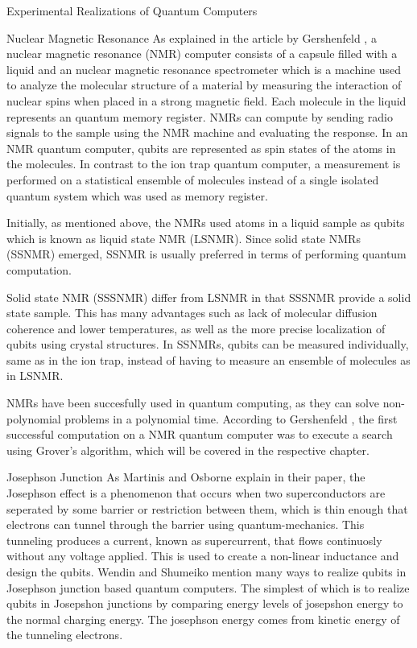 \documentclass[aps,preprintnumbers,twocolumn]{revtex4}
\begin{document}
\begin{section}{Experimental Realizations of Quantum Computers}
\begin{subsection}{Nuclear Magnetic Resonance}
As explained in the article by Gershenfeld \cite{Gershenfeld1998QuantumCW}, a nuclear magnetic resonance (NMR) computer consists of a capsule filled with a liquid and an nuclear magnetic resonance spectrometer which is a machine used to analyze the molecular structure of a material by measuring the interaction of nuclear spins when placed in a strong magnetic field.
Each molecule in the liquid represents an quantum memory register. 
NMRs can compute by sending radio signals to the sample using the NMR machine and evaluating the response. 
In an NMR quantum computer, qubits are represented as spin states of the atoms in the molecules. 
In contrast to the ion trap quantum computer, 
a measurement is performed on a statistical ensemble of molecules instead of a single isolated quantum system which was used as memory register. 

Initially, as mentioned above, the NMRs used atoms in a liquid sample as qubits which is known as liquid state NMR (LSNMR). 
Since solid state NMRs (SSNMR) emerged, SSNMR is usually preferred in terms of performing quantum computation.

Solid state NMR (SSSNMR) differ from LSNMR in that SSSNMR provide a solid state sample.
This has many advantages such as lack of molecular diffusion coherence and lower temperatures, as well as the more precise localization of qubits using crystal structures.
In SSNMRs, qubits can be measured individually, same as in the ion trap,
instead of having to measure an ensemble of molecules as in LSNMR. 

NMRs have been succesfully used in quantum computing, as they can solve non-polynomial problems in a polynomial time.
According to Gershenfeld \cite{Gershenfeld1998QuantumCW}, the first successful computation on a NMR quantum computer was to execute a search using Grover's algorithm, 
which will be covered in the respective chapter. 
\end{subsection}

\begin{subsection}{Josephson Junction}
As Martinis and Osborne explain in their paper, 
the Josephson effect is a phenomenon that occurs when two superconductors are seperated 
by some barrier or restriction between them, which is thin enough that electrons can tunnel through the barrier using quantum-mechanics. 
This tunneling produces a current, known as supercurrent, that flows continuosly without any voltage applied. 
This is used to create a non-linear inductance and design the qubits. 
Wendin and Shumeiko mention \cite{shumeiko} many ways to realize qubits in Josephson junction based quantum computers. 
The simplest of which is to realize qubits in Josepshon junctions by comparing energy levels of josepshon energy to the normal charging energy. 
The josephson energy comes from kinetic energy of the tunneling electrons.


\end{subsection}
\end{section}
\end{document}

